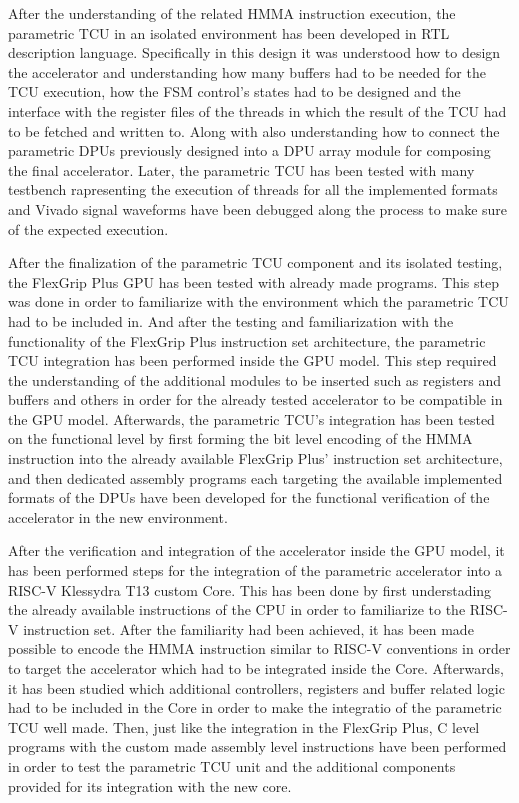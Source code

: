 After the understanding of the related HMMA instruction execution, the parametric TCU in an isolated environment has been developed in RTL description language. Specifically in this design it was understood how to design the accelerator and understanding how many buffers had to be needed for the TCU execution, how the FSM control's states had to be designed and the interface with the register files of the threads in which the result of the TCU had to be fetched and written to. Along with also understanding how to connect the parametric DPUs previously designed into a DPU array module for composing the final accelerator. Later, the parametric TCU has been tested with many testbench rapresenting the execution of threads for all the implemented formats and Vivado signal waveforms have been debugged along the process to make sure of the expected execution. 

After the finalization of the parametric TCU component and its isolated testing, the FlexGrip Plus GPU has been tested with already made programs. This step was done in order to familiarize with the environment which the parametric TCU had to be included in. And after the testing and familiarization with the functionality of the FlexGrip Plus instruction set architecture, the parametric TCU integration has been performed inside the GPU model. This step required the understanding of the additional modules to be inserted such as registers and buffers and others in order for the already tested accelerator to be compatible in the GPU model. Afterwards, the parametric TCU's integration has been tested on the functional level by first forming the bit level encoding of the HMMA instruction into the already available FlexGrip Plus' instruction set architecture, and then dedicated assembly programs each targeting the available implemented formats of the DPUs have been developed for the functional verification of the accelerator in the new environment. 

After the verification and integration of the accelerator inside the GPU model, it has been performed steps for the integration of the parametric accelerator into a RISC-V Klessydra T13 custom Core. This has been done by first understading the already available instructions of the CPU in order to familiarize to the RISC-V instruction set. After the familiarity had been achieved, it has been made possible to encode the HMMA instruction similar to RISC-V conventions in order to target the accelerator which had to be integrated inside the Core. Afterwards, it has been studied which additional controllers, registers and buffer related logic had to be included in the Core in order to make the integratio of the parametric TCU well made. Then, just like the integration in the FlexGrip Plus, C level programs with the custom made assembly level instructions have been performed in order to test the parametric TCU unit and the additional components provided for its integration with the new core. 

